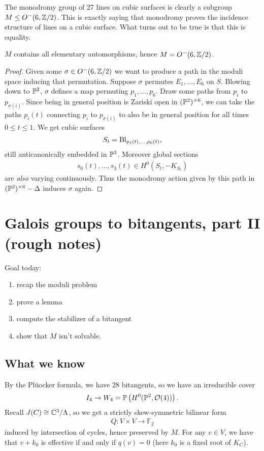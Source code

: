 \documentclass[11pt]{amsart}
\begin{document}
The monodromy group of 27 lines on cubic surfaces is clearly a subgroup $M \le O^-(6,\Z/2)$. This is exactly saying that monodromy proves the incidence structure of lines on a cubic surface. What turns out to be true is that this is equality.

\begin{theorem} $M$ contains all elementary automorphisms, hence $M = O^-(6,\Z/2)$.
\end{theorem}
\begin{proof} Given some $\sigma \in O^-(6,\Z/2)$ we want to produce a path in the moduli space inducing that permutation. Suppose $\sigma$ permutes $E_1, \ldots, E_6$ on $S$. Blowing down to $\P^2$, $\sigma$ defines a map permuting $p_1, \ldots, p_6$. Draw some paths from $p_i$ to $p_{\sigma(i)}$. Since being in general position is Zariski open in $(\P^2)^{\times6}$, we can take the paths $p_i(t)$ connecting $p_i$ to $p_{\sigma(i)}$ to also be in general position for all times $0\le t \le 1$. We get cubic surfaces
\begin{align*}
    S_t = \Bl_{p_1(t), \ldots, p_6(t)},
\end{align*}
still anticanonically embedded in $\P^3$. Moreover global sections 
\begin{align*}
    s_0(t), \ldots, s_3(t) \in H^0(S_t, -K_{S_t})
\end{align*}
are \textit{also} varying continuously. Thus the monodromy action given by this path in $(\P^2)^{\times6}-\Delta$ induces $\sigma$ again.
\end{proof}


\section{Galois groups to bitangents, part II (rough notes)}

Goal today:
\begin{enumerate}
    \item recap the moduli problem
    \item prove a lemma
    \item compute the stabilizer of a bitangent
    \item show that $M$ isn't solvable.
\end{enumerate}

\subsection{What we know}

By the Pl\"{u}ocker formula, we have 28 bitangents, so we have an irreducible cover
\begin{align*}
    I_4 \to W_4 = \mathbb{P} \left( H^0(\P^2, \O(4)) \right).
\end{align*}
Recall $J(C)\cong \C^3/\Lambda$, so we get a strictly skew-symmetric bilinear form
\begin{align*}
    Q \colon V \times V \to \mathbb{F}_2
\end{align*}
induced by intersection of cycles, hence preserved by $M$. For any $v\in V$, we have that $v + k_0$ is effective if and only if $q(v) = 0$ (here $k_0$ is a fixed root of $K_C$).
\end{document}

